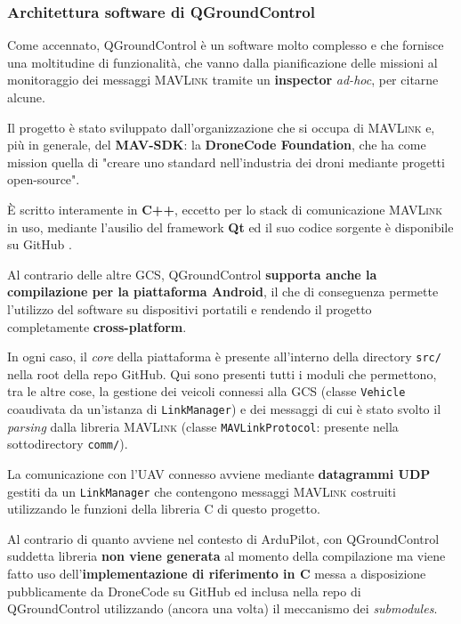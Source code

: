 \documentclass[a4paper, 12pt, oneside]{article}
\theoremstyle{definition}
\begin{document}
\subsubsection{Architettura software di QGroundControl}

Come accennato, QGroundControl è un software molto complesso e che fornisce una moltitudine di funzionalità, che vanno dalla pianificazione delle missioni al monitoraggio dei messaggi \textsc{MAVLink} tramite un \textbf{inspector} \textit{ad-hoc}, per citarne alcune.

Il progetto è stato sviluppato dall'organizzazione che si occupa di \textsc{MAVLink} e, più in generale, del \textbf{MAV-SDK}: la \textbf{DroneCode Foundation}, che ha come mission quella di "creare uno standard nell'industria dei droni mediante progetti open-source"\cite{dronecode}. 

È scritto interamente in \textbf{C++}, eccetto per lo stack di comunicazione \textsc{MAVLink} in uso, mediante l'ausilio del framework \textbf{Qt} ed il suo codice sorgente è disponibile su GitHub \cite{qgc-github}.

Al contrario delle altre GCS, QGroundControl \textbf{supporta anche la compilazione per la piattaforma Android}\cite{qgc-github-android}, il che di conseguenza permette l'utilizzo del software su dispositivi portatili e rendendo il progetto completamente \textbf{cross-platform}.

In ogni caso, il \textit{core} della piattaforma è presente all'interno della directory \texttt{src/} nella root della repo GitHub. Qui sono presenti tutti i moduli che permettono, tra le altre cose, la gestione dei veicoli connessi alla GCS (classe \texttt{Vehicle} coaudivata da un'istanza di \texttt{LinkManager}) e dei messaggi di cui è stato svolto il \textit{parsing} dalla libreria \textsc{MAVLink} (classe \texttt{MAVLinkProtocol}: presente nella sottodirectory \texttt{comm/}).

La comunicazione con l'UAV connesso avviene mediante \textbf{datagrammi UDP} gestiti da un \texttt{LinkManager} che contengono messaggi \textsc{MAVLink} costruiti utilizzando le funzioni della libreria C di questo progetto.

Al contrario di quanto avviene nel contesto di ArduPilot, con QGroundControl suddetta libreria \textbf{non viene generata} al momento della compilazione ma viene fatto uso dell'\textbf{implementazione di riferimento in C} \cite{mavlink-c-implementation} messa a disposizione pubblicamente da DroneCode su GitHub ed inclusa nella repo di QGroundControl utilizzando (ancora una volta) il meccanismo dei \textit{submodules}.
\end{document}
